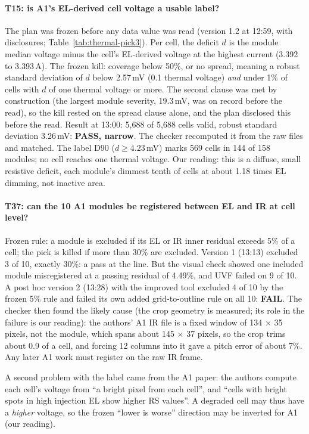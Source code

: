 \paragraph{T15: is A1's EL-derived cell voltage a usable label?} The plan was frozen before any data value was read (version 1.2 at
12:59, with disclosures; Table~\ref{tab:thermal-pick3}). Per cell, the deficit $d$ is the module median voltage minus the cell's
EL-derived voltage at the highest current (3.392 to 3.393\,A). The frozen kill: coverage below 50\%, or no spread, meaning a robust
standard deviation of $d$ below 2.57\,mV (0.1 thermal voltage) \emph{and} under 1\% of cells with $d$ of one thermal voltage or more.
The second clause was met by construction (the largest module severity, 19.3\,mV, was on record before the read), so the kill rested on
the spread clause alone, and the plan disclosed this before the read. Result at 13:00: 5,688 of 5,688 cells valid, robust standard
deviation 3.26\,mV: \textbf{PASS, narrow}. The checker recomputed it from the raw files and matched. The label D90 ($d \geq 4.23$\,mV)
marks 569 cells in 144 of 158 modules; no cell reaches one thermal voltage. Our reading: this is a diffuse, small resistive deficit,
each module's dimmest tenth of cells at about 1.18 times EL dimming, not inactive area.

\paragraph{T37: can the 10 A1 modules be registered between EL and IR at cell level?} Frozen rule: a module is excluded if its EL or
IR inner residual exceeds 5\% of a cell; the pick is killed if more than 30\% are excluded. Version 1 (13:13) excluded 3 of 10, exactly
30\%: a pass at the line. But the visual check showed one included module misregistered at a passing residual of 4.49\%, and UVF failed
on 9 of 10. A post hoc version 2 (13:28) with the improved tool excluded 4 of 10 by the frozen 5\% rule and failed its own added
grid-to-outline rule on all 10: \textbf{FAIL}. The checker then found the likely cause (the crop geometry is measured; its role in the
failure is our reading): the authors' A1 IR file is a fixed window of 134 $\times$ 35 pixels, not the module, which spans about 145
$\times$ 37 pixels, so the crop trims about 0.9 of a cell, and forcing 12 columns into it gave a pitch error of about 7\%. Any later A1
work must register on the raw IR frame.

A second problem with the label came from the A1 paper: the authors compute each cell's voltage from ``a bright pixel from each cell'',
and ``cells with bright spots in high injection EL show higher RS values''. A degraded cell may thus have a \emph{higher} voltage, so
the frozen ``lower is worse'' direction may be inverted for A1 (our reading).

